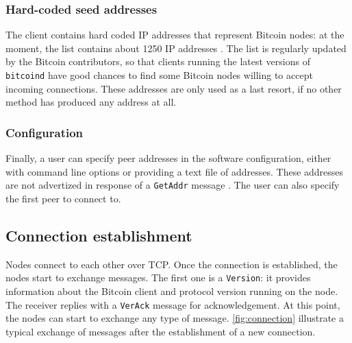 \subsubsection{Hard-coded seed addresses}
The client contains hard coded IP addresses that represent Bitcoin nodes:
at the moment, the list contains about \num{1250} IP addresses \cite{bitcoin_seeds}.
The list is regularly updated by the Bitcoin contributors, so that clients running the latest versions of \texttt{bitcoind} have good chances to find some Bitcoin nodes willing to accept incoming connections.
These addresses are only used as a last resort, if no other method has produced any address at all.

\subsubsection{Configuration}
Finally, a user can specify peer addresses in the software configuration, either with command line options or providing a text file of addresses.
These addresses are not advertized in response of a \texttt{GetAddr} message \cite{bitcoin_peer_discovery}.
The user can also specify the first peer to connect to.

\subsection{Connection establishment}
Nodes connect to each other over TCP.
Once the connection is established, the nodes start to exchange messages.
The first one is a \texttt{Version}:
it provides information about the Bitcoin client and protocol version running on the node.
The receiver replies with a \texttt{VerAck} message for acknowledgement.
At this point, the nodes can start to exchange any type of message.
\cref{fig:connection} illustrate a typical exchange of messages after the establishment of a new connection.

